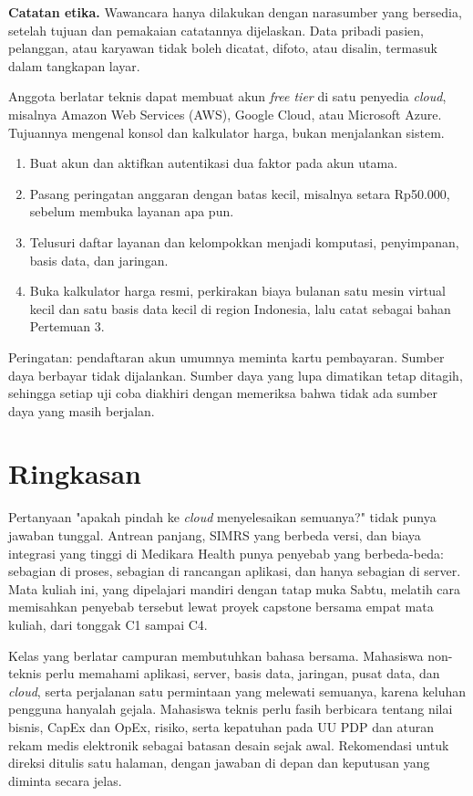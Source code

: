 \textbf{Catatan etika.} Wawancara hanya dilakukan dengan narasumber yang bersedia,
setelah tujuan dan pemakaian catatannya dijelaskan. Data pribadi pasien, pelanggan, atau
karyawan tidak boleh dicatat, difoto, atau disalin, termasuk dalam tangkapan layar.

\begin{pendalaman}[title={Pendalaman Teknis (opsional): Menelusuri Konsol Cloud}]
  Anggota berlatar teknis dapat membuat akun \textit{free tier} di satu penyedia
  \textit{cloud}, misalnya Amazon Web Services (AWS), Google Cloud, atau Microsoft
  Azure. Tujuannya mengenal konsol dan kalkulator harga, bukan menjalankan sistem.
  \begin{enumerate}
    \item Buat akun dan aktifkan autentikasi dua faktor pada akun utama.
    \item Pasang peringatan anggaran dengan batas kecil, misalnya setara Rp50.000,
          sebelum membuka layanan apa pun.
    \item Telusuri daftar layanan dan kelompokkan menjadi komputasi, penyimpanan, basis
          data, dan jaringan.
    \item Buka kalkulator harga resmi, perkirakan biaya bulanan satu mesin virtual kecil
          dan satu basis data kecil di region Indonesia, lalu catat sebagai bahan
          Pertemuan 3.
  \end{enumerate}
  Peringatan: pendaftaran akun umumnya meminta kartu pembayaran. Sumber daya berbayar
  tidak dijalankan. Sumber daya yang lupa dimatikan tetap ditagih, sehingga setiap uji
  coba diakhiri dengan memeriksa bahwa tidak ada sumber daya yang masih berjalan.
\end{pendalaman}

\section{Ringkasan}

Pertanyaan "apakah pindah ke \textit{cloud} menyelesaikan semuanya?" tidak punya jawaban
tunggal. Antrean panjang, SIMRS yang berbeda versi, dan biaya integrasi yang tinggi di
Medikara Health punya penyebab yang berbeda-beda: sebagian di proses, sebagian di
rancangan aplikasi, dan hanya sebagian di server. Mata kuliah ini, yang dipelajari
mandiri dengan tatap muka Sabtu, melatih cara memisahkan penyebab tersebut lewat proyek
capstone bersama empat mata kuliah, dari tonggak C1 sampai C4.

Kelas yang berlatar campuran membutuhkan bahasa bersama. Mahasiswa non-teknis perlu
memahami aplikasi, server, basis data, jaringan, pusat data, dan \textit{cloud}, serta
perjalanan satu permintaan yang melewati semuanya, karena keluhan pengguna hanyalah
gejala. Mahasiswa teknis perlu fasih berbicara tentang nilai bisnis, CapEx dan OpEx,
risiko, serta kepatuhan pada UU PDP dan aturan rekam medis elektronik sebagai batasan
desain sejak awal. Rekomendasi untuk direksi ditulis satu halaman, dengan jawaban di
depan dan keputusan yang diminta secara jelas.


